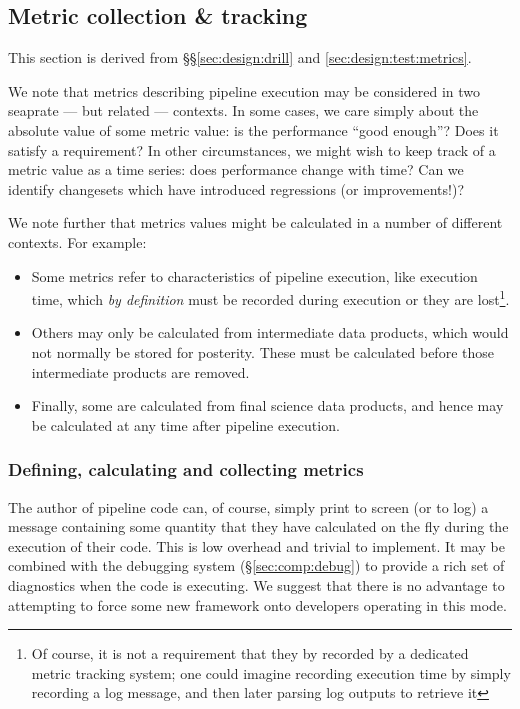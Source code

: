 \subsection{Metric collection \& tracking}
\label{sec:comp:metric}

This section is derived from \S\S\ref{sec:design:drill} and \ref{sec:design:test:metrics}.

We note that metrics describing pipeline execution may be considered in two seaprate --- but related --- contexts.
In some cases, we care simply about the absolute value of some metric value: is the performance ``good enough''?
Does it satisfy a requirement?
In other circumstances, we might wish to keep track of a metric value as a time series: does performance change with time?
Can we identify changesets which have introduced regressions (or improvements!)?

We note further that metrics values might be calculated in a number of different contexts.
For example:

\begin{itemize}

  \item{Some metrics refer to characteristics of pipeline execution, like execution time, which \emph{by definition} must be recorded during execution or they are lost\footnote{Of course, it is not a requirement that they by recorded by a dedicated metric tracking system; one could imagine recording execution time by simply recording a log message, and then later parsing log outputs to retrieve it}.}

  \item{Others may only be calculated from intermediate data products, which would not normally be stored for posterity. These must be calculated before those intermediate products are removed.}

  \item{Finally, some are calculated from final science data products, and hence may be calculated at any time after pipeline execution.}

\end{itemize}

\subsubsection{Defining, calculating and collecting metrics}
\label{sec:comp:metric:collect}

The author of pipeline code can, of course, simply print to screen (or to log) a message containing some quantity that they have calculated on the fly during the execution of their code.
This is low overhead and trivial to implement.
It may be combined with the debugging system (\S\ref{sec:comp:debug}) to provide a rich set of diagnostics when the code is executing.
We suggest that there is no advantage to attempting to force some new framework onto developers operating in this mode.

